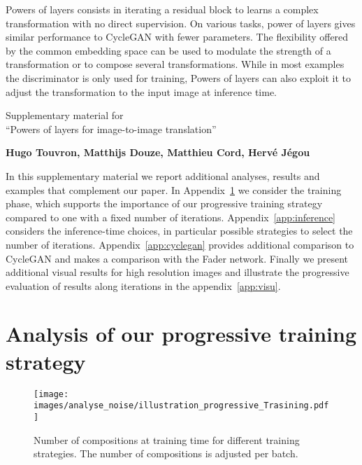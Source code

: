 \documentclass[a4paper,10pt]{extarticle}
\begin{document}
Powers of layers consists in iterating a residual block to learns a complex transformation with no direct supervision. 
On various tasks, power of layers gives similar performance to CycleGAN with fewer parameters. 
The flexibility offered by the common embedding space can be used to modulate the strength of a transformation or to compose several transformations.
While in most examples the discriminator is only used for training, 
Powers of layers can also exploit it to adjust the transformation to the input image at inference time. 


\clearpage


\clearpage \newpage \appendix\newpage

\begin{center}
{\LARGE
Supplementary material for \\
``Powers of layers for image-to-image translation'' 
\vspace{1cm} \newline 
}

\textbf{Hugo Touvron, Matthijs Douze, Matthieu Cord, Herv\'e J\'egou \vspace{1em}}
\end{center}
\vspace*{1cm}

In this supplementary material we report additional analyses, results and examples that complement our paper. 
In Appendix~\ref{app:training} we consider the training phase, which supports the importance of our progressive training strategy compared to one with a fixed number of iterations. 
Appendix~\ref{app:inference} considers the inference-time choices, in particular possible strategies to select the number of iterations. 
Appendix~\ref{app:cyclegan} provides additional comparison to CycleGAN and makes a comparison with the Fader network. 
Finally we present additional visual results for high resolution images and illustrate the progressive evaluation of results along iterations in the appendix~\ref{app:visu}. 

\section{Analysis of our progressive training strategy}
\label{app:training}

\begin{figure}[b]
\centering
\texttt{[image: images/analyse\_noise/illustration\_progressive\_Trasining.pdf]}

\caption{\label{fig:illustration_training}
  Number of compositions at training time for different training strategies.
  The number of compositions is adjusted per batch. 
}
\end{figure} 
\end{document}
